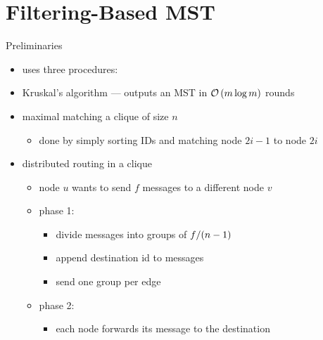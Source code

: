 \section{Filtering-Based MST}
\begin{frame}{Preliminaries}
    \begin{itemize}
        \item uses three procedures:
        \item Kruskal's algorithm --- outputs an MST in $\mathcal{O}\left(m\log{m}\right)$ rounds
        \item maximal matching a clique of size $n$
              \begin{itemize}
                  \item done by simply sorting IDs and matching node $2i - 1$ to node $2i$
              \end{itemize}
        \item distributed routing in a clique
              \begin{itemize}
                  \item node $u$ wants to send $f$ messages to a different node $v$
                  \item phase 1:
                        \begin{itemize}
                            \item divide messages into groups of $f / (n-1)$
                            \item append destination id to messages
                            \item send one group per edge
                        \end{itemize}
                  \item phase 2:
                        \begin{itemize}
                            \item each node forwards its message to the destination
                        \end{itemize}
              \end{itemize}
    \end{itemize}
\end{frame}
